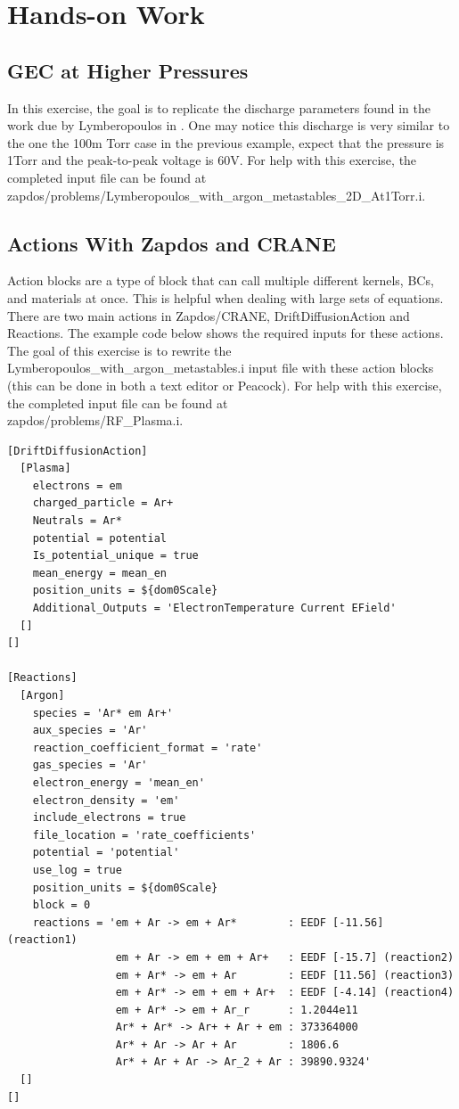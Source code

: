 \documentclass[final]{report}
\begin{document}
 \section{Hands-on Work}
 \subsection{GEC at Higher Pressures}
 In this exercise, the goal is to replicate the discharge parameters found in the work due by Lymberopoulos in \cite{2D_GEC_1Torr}. One may notice this discharge is very similar to the one the 100m Torr case in the previous example, expect that the pressure is 1Torr and the peak-to-peak voltage is 60V. For help with this exercise, the completed input file can be found at zapdos/problems/Lymberopoulos\_with\_argon\_metastables\_2D\_At1Torr.i.

  \subsection{Actions With Zapdos and CRANE}
  Action blocks are a type of block that can call multiple different kernels, BCs, and materials at once. This is helpful when dealing with large sets of equations. There are two main actions in Zapdos/CRANE, DriftDiffusionAction and Reactions. The example code below shows the required inputs for these actions. The goal of this exercise is to rewrite the Lymberopoulos\_with\_argon\_metastables.i input file with these action blocks (this can be done in both a text editor or Peacock). For help with this exercise, the completed input file can be found at \\
  zapdos/problems/RF\_Plasma.i.

  \begin{verbatim}
[DriftDiffusionAction]
  [Plasma]
    electrons = em
    charged_particle = Ar+
    Neutrals = Ar*
    potential = potential
    Is_potential_unique = true
    mean_energy = mean_en
    position_units = ${dom0Scale}
    Additional_Outputs = 'ElectronTemperature Current EField'
  []
[]

[Reactions]
  [Argon]
    species = 'Ar* em Ar+'
    aux_species = 'Ar'
    reaction_coefficient_format = 'rate'
    gas_species = 'Ar'
    electron_energy = 'mean_en'
    electron_density = 'em'
    include_electrons = true
    file_location = 'rate_coefficients'
    potential = 'potential'
    use_log = true
    position_units = ${dom0Scale}
    block = 0
    reactions = 'em + Ar -> em + Ar*        : EEDF [-11.56] (reaction1)
                 em + Ar -> em + em + Ar+   : EEDF [-15.7] (reaction2)
                 em + Ar* -> em + Ar        : EEDF [11.56] (reaction3)
                 em + Ar* -> em + em + Ar+  : EEDF [-4.14] (reaction4)
                 em + Ar* -> em + Ar_r      : 1.2044e11
                 Ar* + Ar* -> Ar+ + Ar + em : 373364000
                 Ar* + Ar -> Ar + Ar        : 1806.6
                 Ar* + Ar + Ar -> Ar_2 + Ar : 39890.9324'
  []
[]
  \end{verbatim}
\end{document}

